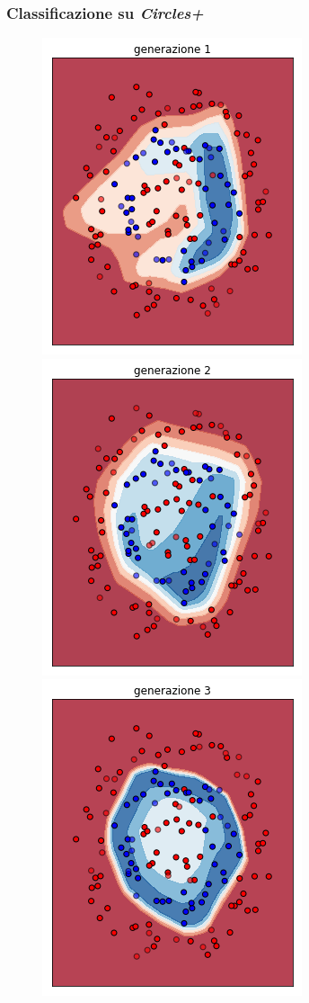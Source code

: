 \documentclass{beamer}
\begin{document}
\begin{frame}
 \frametitle{Classificazione su \textit{Circles+}}
 \begin{figure}
  \centering
  \includegraphics[scale = 0.25]{images/circle+-rnd-log./1.png}
  \includegraphics[scale = 0.25]{images/circle+-rnd-log./2.png}
  \includegraphics[scale = 0.25]{images/circle+-rnd-log./3.png}

\end{figure}
\end{frame}
\end{document}
